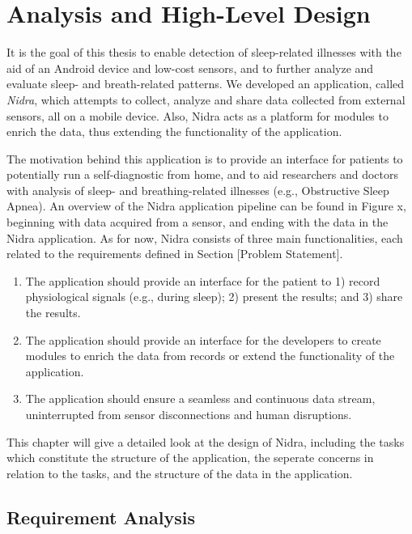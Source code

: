 
\chapter{Analysis and High-Level Design}

It is the goal of this thesis to enable detection of sleep-related illnesses 
with the aid of an Android device and low-cost sensors, and to further analyze 
and evaluate sleep- and breath-related patterns. We developed an application, 
called \textit{Nidra}, which attempts to collect, analyze and share data collected 
from external sensors, all on a mobile device. Also, Nidra acts as a platform for 
modules to enrich the data, thus extending the functionality of the application.

The motivation behind this application is to provide an interface for patients 
to potentially run a self-diagnostic from home, and to aid 
researchers and doctors with analysis of sleep- and breathing-related illnesses 
(e.g., Obstructive Sleep Apnea). An overview of the Nidra application pipeline 
can be found in Figure x, beginning with data acquired from a sensor, and ending 
with the data in the Nidra application. As for now, Nidra consists of three 
main functionalities, each related to the requirements defined in Section [Problem Statement]. 

\begin{enumerate}
    \item The application should provide an interface for the patient to 1) record physiological signals (e.g., during sleep); 2) present the results; and 3) share the results.
    \item The application should provide an interface for the developers to create modules to enrich the data from records or extend the functionality of the application. 
    \item The application should ensure a seamless and continuous data stream, uninterrupted from sensor disconnections and human disruptions.
\end{enumerate}

This chapter will give a detailed look at the design of Nidra, including the tasks which constitute the structure of the application, the seperate concerns in relation to the tasks, and the structure of the data in the application.

\section{Requirement Analysis}

